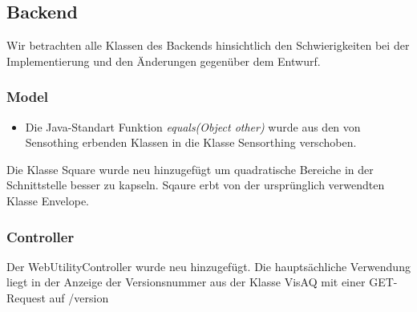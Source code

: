 \subsection{Backend}
Wir betrachten alle Klassen des Backends hinsichtlich den Schwierigkeiten bei der Implementierung und den Änderungen gegenüber dem Entwurf.

\subsubsection{Model}
\noChange
{}
\noChange
{}
\noChange
{}
\noChange
{}
\changedFunctions
\begin{itemize}[noitemsep]
    \item Die Java-Standart Funktion \textit{equals(Object other)} wurde aus den von Sensothing erbenden Klassen in die Klasse Sensorthing verschoben.
\end{itemize}
\noChange
{}
\noChange
{}
\noChange
{}
\noChange
{}
Die Klasse Square wurde neu hinzugefügt um quadratische Bereiche in der Schnittstelle besser zu kapseln. Sqaure erbt von der ursprünglich verwendten Klasse Envelope.

\subsubsection{Controller}
\noChange
{}
\noChange
{}
\noChange
{}
\noChange
{}
\noChange
{}
\noChange
{}
\noChange
Der WebUtilityController wurde neu hinzugefügt. Die hauptsächliche Verwendung liegt in der Anzeige der Versionsnummer aus der Klasse VisAQ mit einer GET-Request auf /version

